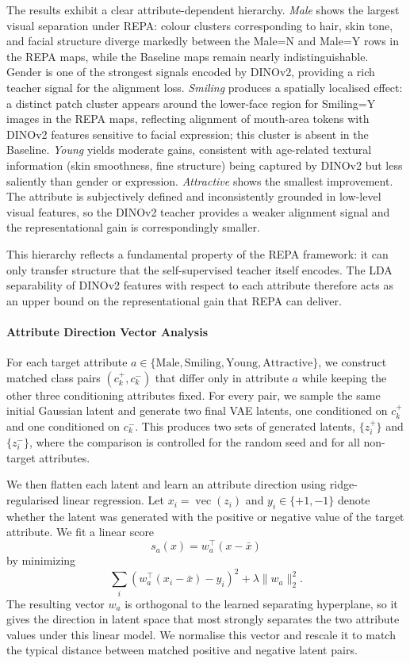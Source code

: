 The results exhibit a clear attribute-dependent hierarchy.
\emph{Male} shows the largest visual separation under REPA: colour clusters
corresponding to hair, skin tone, and facial structure diverge markedly between
the Male=N and Male=Y rows in the REPA maps, while the Baseline maps remain
nearly indistinguishable. Gender is one of the strongest signals encoded by
DINOv2, providing a rich teacher signal for the alignment loss.
\emph{Smiling} produces a spatially localised effect: a distinct patch
cluster appears around the lower-face region for Smiling=Y images in the REPA
maps, reflecting alignment of mouth-area tokens with DINOv2 features sensitive
to facial expression; this cluster is absent in the Baseline.
\emph{Young} yields moderate gains, consistent with age-related textural
information (skin smoothness, fine structure) being captured by DINOv2 but less
saliently than gender or expression.
\emph{Attractive} shows the smallest improvement. The attribute is
subjectively defined and inconsistently grounded in low-level visual features,
so the DINOv2 teacher provides a weaker alignment signal and the representational
gain is correspondingly smaller.

This hierarchy reflects a fundamental property of the REPA framework: it can
only transfer structure that the self-supervised teacher itself encodes. The
LDA separability of DINOv2 features with respect to each attribute therefore
acts as an upper bound on the representational gain that REPA can deliver.

\paragraph{Attribute Direction Vector Analysis}

For each target attribute
$a \in \{\text{Male}, \text{Smiling}, \text{Young}, \text{Attractive}\}$, we
construct matched class pairs $(c_k^{+}, c_k^{-})$ that differ only in attribute
$a$ while keeping the other three conditioning attributes fixed. For every pair,
we sample the same initial Gaussian latent and generate two final VAE latents,
one conditioned on $c_k^{+}$ and one conditioned on $c_k^{-}$. This produces two
sets of generated latents, $\{z_i^{+}\}$ and $\{z_i^{-}\}$, where the comparison
is controlled for the random seed and for all non-target attributes.

We then flatten each latent and learn an attribute direction using
ridge-regularised linear regression. Let $x_i=\operatorname{vec}(z_i)$ and
$y_i \in \{+1,-1\}$ denote whether the latent was generated with the positive or
negative value of the target attribute. We fit a linear score
\[
  s_a(x) = w_a^\top (x - \bar{x})
\]
by minimizing
\[
  \sum_i \left(w_a^\top (x_i-\bar{x}) - y_i\right)^2
  + \lambda \|w_a\|_2^2 .
\]
The resulting vector $w_a$ is orthogonal to the learned separating hyperplane,
so it gives the direction in latent space that most strongly separates the two
attribute values under this linear model. We normalise this vector and rescale it
to match the typical distance between matched positive and negative latent pairs.

